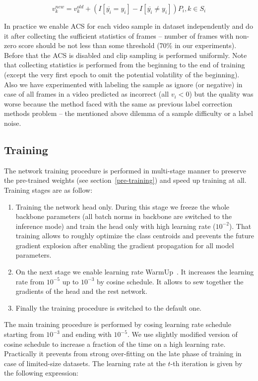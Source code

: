\documentclass[twoside, twocolumn]{article}
\begin{document}
\begin{equation}
\label{eq:score_update}
v_{k}^{new} = v_{k}^{old} + (I[\overline{y_i} = y_i] - I[\overline{y_i} \neq y_i])P_i, k \in S_i
\end{equation}

In practice we enable ACS for each video sample in dataset independently and do it after collecting the sufficient
statistics of frames -- number of frames with non-zero score should be not less than some threshold (70\% in our
experiments). Before that the ACS is disabled and clip sampling is performed uniformly. Note that collecting statistics
is performed from the beginning to the end of training (except the very first epoch to omit the potential volatility of
the beginning). Also we have experimented with labeling the sample as ignore (or negative) in case of all frames in a
video predicted as incorrect (all $v_i < 0$) but the quality was worse because the method faced with the same as
previous label correction methods problem -- the mentioned above dilemma of a sample difficulty or a label noise.

\subsection{Training}

\lettrine[nindent=0em,lines=3]{T}{}he network training procedure is performed in multi-stage manner to preserve the
pre-trained weights (see section~\ref{pre-training}) and speed up training at all. Training stages are as follow:

\begin{enumerate}
\item Training the network head only. During this stage we freeze the whole backbone parameters (all batch norms in
backbone are switched to the inference mode) and train the head only with high learning rate ($10^{-2}$). That training
allows to roughly optimize the class centroids and prevents the future gradient explosion after enabling the gradient
propagation for all model parameters.
\item On the next stage we enable learning rate WarmUp~\cite{WarmUp}. It increases the learning rate from $10^{-5}$ up
to $10^{-3}$ by cosine schedule. It allows to sew together the gradients of the head and the rest network.
\item Finally the training procedure is switched to the default one.
\end{enumerate}

The main training procedure is performed by cosing learning rate schedule starting from $10^{-3}$ and ending with
$10^{-5}$. We use slightly modified version of cosine schedule to increase a fraction of the time on a high learning
rate. Practically it prevents from strong over-fitting on the late phase of training in case of limited-size datasets.
The learning rate at the $t$-th iteration is given by the following expression:
\end{document}
